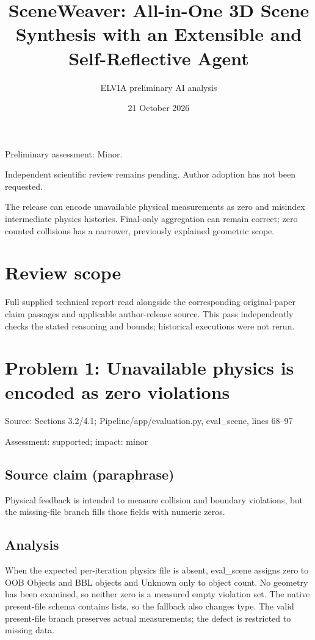 \documentclass[11pt]{article}
\begin{document}
\title{SceneWeaver: All-in-One 3D Scene Synthesis with an Extensible and Self-Reflective Agent}

\author{ELVIA preliminary AI analysis}\date{21 October 2026}\maketitle

Preliminary assessment: Minor.\par

Independent scientific review remains pending. Author adoption has not been requested.

The release can encode unavailable physical measurements as zero and misindex intermediate physics histories. Final-only aggregation can remain correct; zero counted collisions has a narrower, previously explained geometric scope.

\section*{Review scope}

Full supplied technical report read alongside the corresponding original-paper claim passages and applicable author-release source. This pass independently checks the stated reasoning and bounds; historical executions were not rerun.

\section*{Problem 1: Unavailable physics is encoded as zero violations}

Source: Sections 3.2/4.1; Pipeline/app/evaluation.py, eval\_scene, lines 68–97

Assessment: supported; impact: minor

\subsection*{Source claim (paraphrase)}

Physical feedback is intended to measure collision and boundary violations, but the missing-file branch fills those fields with numeric zeros.

\subsection*{Analysis}

When the expected per-iteration physics file is absent, eval\_scene assigns zero to OOB Objects and BBL objects and Unknown only to object count. No geometry has been examined, so neither zero is a measured empty violation set. The native present-file schema contains lists, so the fallback also changes type. The valid present-file branch preserves actual measurements; the defect is restricted to missing data.
\end{document}
